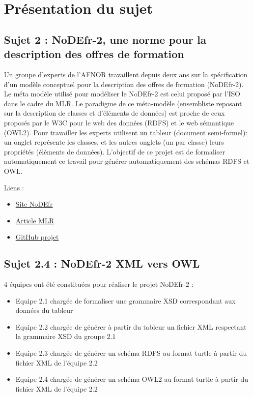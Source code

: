\documentclass[11pt]{report}
\begin{document}
\chapter{Présentation du sujet}

\section{Sujet 2 : NoDEfr-2, une norme pour la description des offres de formation}

Un groupe d'experts de l'AFNOR travaillent depuis deux ans sur la spécification d'un modèle conceptuel pour la description des offres de formation (NoDEfr-2). Le méta modèle utilisé pour modéliser le NoDEfr-2 est celui proposé par l'ISO dans le cadre du MLR. Le paradigme de ce méta-modèle (ensembliste reposant sur la description de classes et d'éléments de données) est proche de ceux proposés par le W3C pour le web des données (RDFS) et le web sémantique (OWL2). Pour travailler les experts utilisent un tableur (document semi-formel): un onglet représente les classes, et les autres onglets (un par classe) leurs propriétés (éléments de données). L'objectif de ce projet est de formaliser automatiquement ce travail pour générer automatiquement des schémas RDFS et OWL.
\hfill \break

Liens :
\begin{itemize}
\item \href{https://sourcesup.renater.fr/www/nodefr/index.html}{Site NoDEfr}
\item \href{https://hal.archives-ouvertes.fr/hal-01801633}{Article MLR}
\item \href{https://github.com/Zaneriis/DocWeb}{GitHub projet}
\end{itemize}

\section{Sujet 2.4 : NoDEfr-2 XML vers OWL}

4 équipes ont été constituées pour réaliser le projet NoDEfr-2 :
\begin{itemize}
\item Equipe 2.1 chargée de formaliser une grammaire XSD correspondant aux données du tableur
\item Equipe 2.2 chargée de générer à partir du tableur un fichier XML respectant la grammaire XSD du groupe 2.1
\item Equipe 2.3 chargée de générer un schéma RDFS au format turtle à partir du fichier XML de l'équipe 2.2
\item Equipe 2.4 chargée de générer un schéma OWL2 au format turtle à partir du fichier XML de l'équipe 2.2
\end{itemize}
\hfill \break
\end{document}
